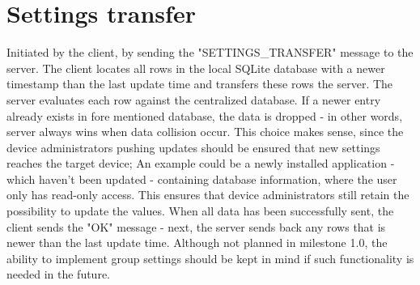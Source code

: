 \section{Settings transfer}
Initiated by the client, by sending the "SETTINGS\_TRANSFER" message to the server. The client locates all rows in the local SQLite database with a newer timestamp than the last update time and transfers these rows the server. The server evaluates each row against the centralized database. If a newer entry already exists in fore mentioned database, the data is dropped - in other words, server always wins when data collision occur. This choice makes sense, since the device administrators pushing updates should be ensured that new settings reaches the target device; An example could be a newly installed application - which haven't been updated - containing database information, where the user only has read-only access. This ensures that device administrators still retain the possibility to update the values.
When all data has been successfully sent, the client sends the "OK" message - next, the server sends back any rows that is newer than the last update time. Although not planned in milestone 1.0, the ability to implement group settings should be kept in mind if such functionality is needed in the future. 


